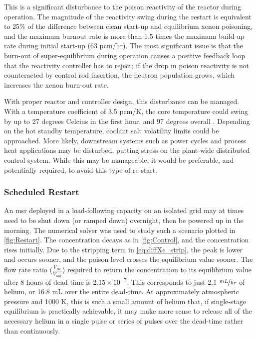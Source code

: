 This is a significant disturbance to the poison reactivity of the reactor during operation. The magnitude of the reactivity swing during the restart is equivalent to 25\% of the difference between clean start-up and equilibrium xenon poisoning, and the maximum burnout rate is more than 1.5 times the maximum \Xe build-up rate during initial start-up (63 pcm/hr). The most significant issue is that the burn-out of super-equilibrium \Xe during operation causes a positive feedback loop that the reactivity controller has to reject; if the drop in poison reactivity is not counteracted by control rod insertion, the neutron population grows, which increases the xenon burn-out rate.

With proper reactor and controller design, this disturbance can be managed. With a temperature coefficient of 3.5 pcm/K, the core temperature could swing by up to 27 degrees Celcius in the first hour, and 97 degrees overall \cite{CarterMCNP}. Depending on the hot standby temperature, coolant salt volatility limits could be approached. More likely, downstream systems such as power cycles and process heat applications may be disturbed, putting stress on the plant-wide distributed control system. While this may be manageable, it would be preferable, and potentially required, to avoid this type of re-start.

\subsubsection{Scheduled Restart}
An \acs{msr} deployed in a load-following capacity on an isolated grid may at times need to be shut down (or ramped down) overnight, then be powered up in the morning. The numerical solver was used to study such a scenario plotted in \cref{fig:Restart}. The \I concentration decays as in \cref{fig:Control}, and the \Xe concentration rises initially. Due to the stripping term in \ref{eq:diffXe_strip}, the peak is lower and occurs sooner, and the poison level crosses the equilibrium value sooner. The flow rate ratio ($\frac{\dot{V}_{He}}{\dot{V}_{salt}}$) required to return the \Xe concentration to its equilibrium value after 8 hours of dead-time is $2.15 \times 10^{-7}$. This corresponds to just 2.1 $\nicefrac{mL}{hr}$ of helium, or 16.8 mL over the entire dead-time. At approximately atmospheric pressure and 1000 K, this is such a small amount of helium that, if single-stage equilibrium is practically achievable, it may make more sense to release all of the necessary helium in a single pulse or series of pulses over the dead-time rather than continuously.

